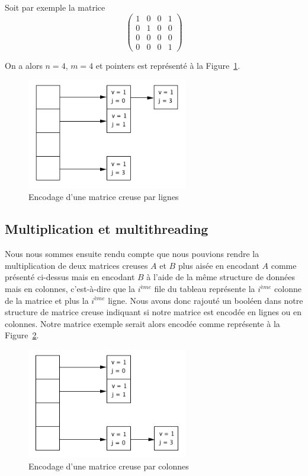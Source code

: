 \documentclass[12pt,a4paper]{article}
\begin{document}
Soit par exemple la matrice
$$\begin{pmatrix}
   1 & 0 & 0 & 1 \\
   0 & 1 & 0 & 0 \\
   0 & 0 & 0 & 0 \\
   0 & 0 & 0 & 1  
\end{pmatrix}$$

On a alors $n = 4$, $m = 4$ et pointers est représenté à la Figure~\ref{encodage}.
\begin{figure}[!h]
	\begin{center}
		\includegraphics[width=7cm]{encodage.png}
		\caption{Encodage d'une matrice creuse par lignes}
		\label{encodage}
	\end{center}
\end{figure}


\subsection{Multiplication et multithreading}
Nous nous sommes ensuite rendu compte que nous pouvions rendre la multiplication de deux matrices creuses $A$ et $B$ plus aisée en encodant $A$ comme présenté ci-dessus mais en encodant $B$ à l'aide de la même structure de données mais en colonnes, c'est-à-dire que la $i^{ème}$ file du tableau représente la $i^{ème}$ colonne de la matrice et plus la $i^{ème}$ ligne. Nous avons donc rajouté un booléen dans notre structure de matrice creuse indiquant si notre matrice est encodée en lignes ou en colonnes. Notre matrice exemple serait alors encodée comme représente à la Figure~\ref{encodage2}.\\

\begin{figure}[!!h]
	\begin{center}
		\includegraphics[width=7cm]{encodage2.png}
		\caption{Encodage d'une matrice creuse par colonnes}
		\label{encodage2}
	\end{center}
\end{figure}
\end{document}
